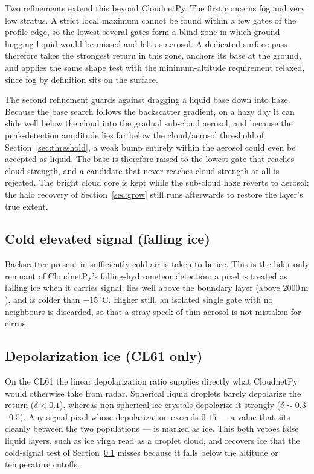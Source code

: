\documentclass[11pt,a4paper]{article}
\newcommand{\degc}{\ensuremath{^\circ\mathrm{C}}}
\begin{document}
Two refinements extend this beyond CloudnetPy. The first concerns fog and very low
stratus. A strict local maximum cannot be found within a few gates of the profile
edge, so the lowest several gates form a blind zone in which ground-hugging liquid
would be missed and left as aerosol. A dedicated surface pass therefore takes the
strongest return in this zone, anchors its base at the ground, and applies the
same shape test with the minimum-altitude requirement relaxed, since fog by
definition sits on the surface.

The second refinement guards against dragging a liquid base down into haze.
Because the base search follows the backscatter gradient, on a hazy day it can
slide well below the cloud into the gradual sub-cloud aerosol; and because the
peak-detection amplitude lies far below the cloud/aerosol threshold of
Section~\ref{sec:threshold}, a weak bump entirely within the aerosol could even be
accepted as liquid. The base is therefore raised to the lowest gate that reaches
cloud strength, and a candidate that never reaches cloud strength at all is
rejected. The bright cloud core is kept while the sub-cloud haze reverts to
aerosol; the halo recovery of Section~\ref{sec:grow} still runs afterwards to
restore the layer's true extent.

\subsection{Cold elevated signal (falling ice)}
\label{sec:falling}

Backscatter present in sufficiently cold air is taken to be ice. This is the
lidar-only remnant of CloudnetPy's falling-hydrometeor detection: a pixel is
treated as falling ice when it carries signal, lies well above the boundary layer
(above $2000\,\mathrm{m}$), and is colder than $-15\,\degc$. Higher still, an
isolated single gate with no neighbours is discarded, so that a stray speck of
thin aerosol is not mistaken for cirrus.

\subsection{Depolarization ice (CL61 only)}
\label{sec:depolice}

On the CL61 the linear depolarization ratio supplies directly what CloudnetPy
would otherwise take from radar. Spherical liquid droplets barely depolarize the
return ($\delta < 0.1$), whereas non-spherical ice crystals depolarize it strongly
($\delta \sim 0.3$--$0.5$). Any signal pixel whose depolarization exceeds $0.15$
--- a value that sits cleanly between the two populations --- is marked as ice.
This both vetoes false liquid layers, such as ice virga read as a droplet cloud,
and recovers ice that the cold-signal test of Section~\ref{sec:falling} misses
because it falls below the altitude or temperature cutoffs.
\end{document}
